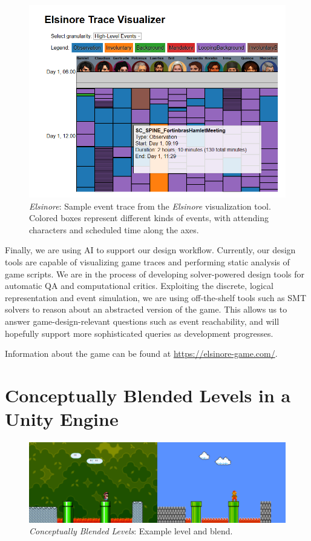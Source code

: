 \documentclass[letterpaper]{article}
\begin{document}
\begin{figure}[tbh]
  \centering
  \includegraphics[width=\columnwidth]{images/elsinore-tool}
  \caption{\textit{Elsinore}: Sample event trace from the \textit{Elsinore} visualization tool. Colored boxes represent different kinds of events, with attending characters and scheduled time along the axes.}
  \label{fig:el-tool}
\end{figure}

Finally, we are using AI to support our design workflow.
Currently, our design tools are capable of visualizing game traces and performing static analysis of game scripts.
We are in the process of developing solver-powered design tools for automatic QA and computational critics.
Exploiting the discrete, logical representation and event simulation, we are using off-the-shelf tools such as SMT solvers to reason about an abstracted version of the game.
This allows us to answer game-design-relevant questions such as event reachability, and will hopefully support more sophisticated queries as development progresses.

Information about the game can be found at \url{https://elsinore-game.com/}.



\section{Conceptually Blended Levels in a Unity Engine}

\begin{figure}[tbh]
  \centering
  \includegraphics[width=\columnwidth]{images/conceptual_blend-screen}
  \caption{\textit{Conceptually Blended Levels}: Example level and blend.}
  \label{fig:cb-placeholder}
\end{figure}
\end{document}
